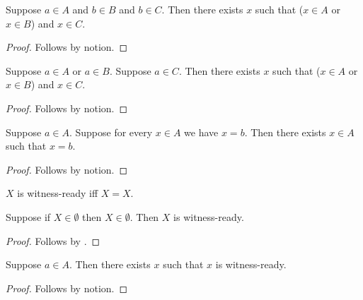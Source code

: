 \begin{proposition}\label{horn_existential_later_disjunct}
    Suppose $a\in A$ and $b\in B$ and $b\in C$.
    Then there exists $x$ such that ($x\in A$ or $x\in B$) and $x\in C$.
\end{proposition}
\begin{proof}
    Follows by notion.
\end{proof}

\begin{proposition}\label{horn_existential_exact_disjunction}
    Suppose $a\in A$ or $a\in B$.
    Suppose $a\in C$.
    Then there exists $x$ such that ($x\in A$ or $x\in B$) and $x\in C$.
\end{proposition}
\begin{proof}
    Follows by notion.
\end{proof}

\begin{proposition}\label{horn_existential_derived_equality}
    Suppose $a\in A$.
    Suppose for every $x\in A$ we have $x=b$.
    Then there exists $x\in A$ such that $x=b$.
\end{proposition}
\begin{proof}
    Follows by notion.
\end{proof}

\begin{definition}\label{horn_existential_ready}
    $X$ is witness-ready iff $X=X$.
\end{definition}

\begin{classification}\label{horn_existential_scoped_rule}
    Suppose if $X\in\emptyset$ then $X\in\emptyset$.
    Then $X$ is witness-ready.
\end{classification}
\begin{proof}
    Follows by .
\end{proof}

\begin{proposition}\label{horn_existential_scoped_producer}
    Suppose $a\in A$.
    Then there exists $x$ such that $x$ is witness-ready.
\end{proposition}
\begin{proof}
    Follows by notion.
\end{proof}
